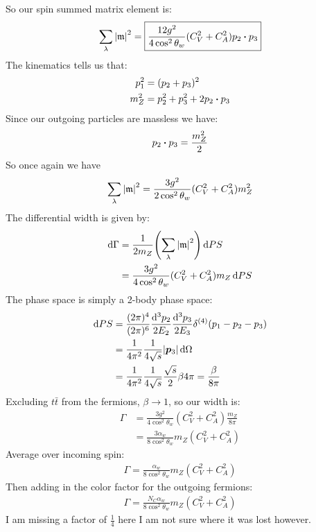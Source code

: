 \documentclass[12pt]{article}
\begin{document}
So our spin summed matrix element is:
\begin{align*}
  \sum_\lambda\abs{\mathfrak{m}}^2=
  \boxed{\frac{12g^2}{4\cos^2\theta_w}(C_V^2+C_A^2)p_2\vdot p_3}
\end{align*}
The kinematics tells us that:
\begin{align*}
  p_1^2&=(p_2+p_3)^2\\
  m_Z^2&=p_2^2+p_3^2+2p_2\vdot p_3
\end{align*}
Since our outgoing particles are massless we have:
\begin{align*}
  p_2\vdot p_3=\frac{m_Z^2}{2}
\end{align*}
So once again we have
\begin{align*}
  \sum_\lambda\abs{\mathfrak{m}}^2=
  \frac{3g^2}{2\cos^2\theta_w}(C_V^2+C_A^2)m_Z^2
\end{align*}
The differential width is given by:
\begin{align*}
  \dd\Gamma&=\frac{1}{2m_Z}\qty(\sum_\lambda\abs{\mathfrak{m}}^2)\dd{PS}\\
  &=\frac{3g^2}{4\cos^2\theta_w}(C_V^2+C_A^2)m_Z\dd{PS}
\end{align*}
The phase space is simply a 2-body phase space:
\begin{align*}
  \dd{PS}&=\frac{(2\pi)^4}{(2\pi)^6}
  \frac{\dd[3]{p_2}}{2E_2}
  \frac{\dd[3]{p_3}}{2E_3}
  \delta^{(4)}(p_1-p_2-p_3)\\
  &=\frac{1}{4\pi^2}\frac{1}{4\sqrt{s}}\abs{\bm{p}_3}\dd{\Omega}\\
  &=\frac{1}{4\pi^2}\frac{1}{4\sqrt{s}}\frac{\sqrt{s}}{2}\beta 4\pi
  =\frac{\beta}{8\pi}
\end{align*}
Excluding $t\bar t$ from the fermions, $\beta\to1$, so our width is:
\begin{align*}
  \Gamma&=\frac{3g^2}{4\cos^2\theta_w}(C_V^2+C_A^2)\frac{m_Z}{8\pi}\\
  &=\frac{3\alpha_w}{8\cos^2\theta_w}m_Z(C_V^2+C_A^2)
\end{align*}
Average over incoming spin:
\begin{align*}
  \Gamma=\frac{\alpha_w}{8\cos^2\theta_w}m_Z(C_V^2+C_A^2)
\end{align*}
Then adding in the color factor for the outgoing fermions:
\begin{align*}
  \boxed{\Gamma=\frac{N_C\alpha_w}{8\cos^2\theta_w}m_Z(C_V^2+C_A^2)}
\end{align*}
I am missing a factor of $\frac{1}{4}$ here I am not sure where it was lost however. 
\end{document}
